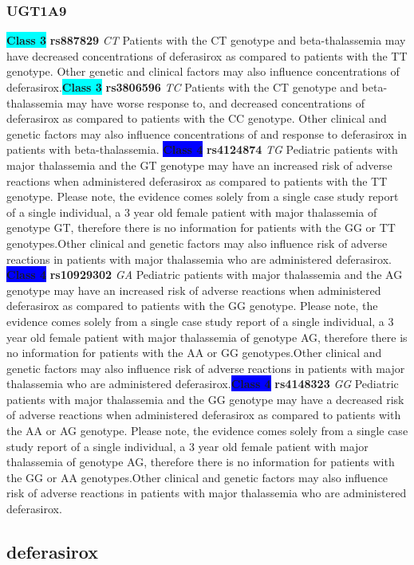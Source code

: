 \documentclass{book}
\begin{document}
\subsubsection{ UGT1A9 }

\begin{center}
\textbf{\colorbox{cyan} {Class 3}} \textbf{ rs887829 } \textit{ CT }
Patients with the CT genotype and beta-thalassemia may have decreased concentrations of deferasirox as compared to patients with the TT genotype. Other genetic and clinical factors may also influence concentrations of deferasirox.\textbf{\colorbox{cyan} {Class 3}} \textbf{ rs3806596 } \textit{ TC }
Patients with the CT genotype and beta-thalassemia may have worse response to, and decreased concentrations of deferasirox as compared to patients with the CC genotype. Other clinical and genetic factors may also influence concentrations of and response to deferasirox in patients with beta-thalassemia.
\textbf{\colorbox{blue} {Class 4}} \textbf{ rs4124874 } \textit{ TG }
Pediatric patients with major thalassemia and the GT genotype may have an increased risk of adverse reactions when administered deferasirox as compared to patients with the TT genotype. Please note, the evidence comes solely from a single case study report of a single individual, a 3 year old female patient with major thalassemia of genotype GT, therefore there is no information for patients with the GG or TT genotypes.Other clinical and genetic factors may also influence risk of adverse reactions in patients with major thalassemia who are administered deferasirox. \textbf{\colorbox{blue} {Class 4}} \textbf{ rs10929302 } \textit{ GA }
Pediatric patients with major thalassemia and the AG genotype may have an increased risk of adverse reactions when administered deferasirox as compared to patients with the GG genotype. Please note, the evidence comes solely from a single case study report of a single individual, a 3 year old female patient with major thalassemia of genotype AG, therefore there is no information for patients with the AA or GG genotypes.Other clinical and genetic factors may also influence risk of adverse reactions in patients with major thalassemia who are administered deferasirox.\textbf{\colorbox{blue} {Class 4}} \textbf{ rs4148323 } \textit{ GG }
Pediatric patients with major thalassemia and the GG genotype may have a decreased risk of adverse reactions when administered deferasirox as compared to patients with the AA or AG genotype. Please note, the evidence comes solely from a single case study report of a single individual, a 3 year old female patient with major thalassemia of genotype AG, therefore there is no information for patients with the GG or AA genotypes.Other clinical and genetic factors may also influence risk of adverse reactions in patients with major thalassemia who are administered deferasirox.

\end{center}\subsection{ deferasirox }
\end{document}
